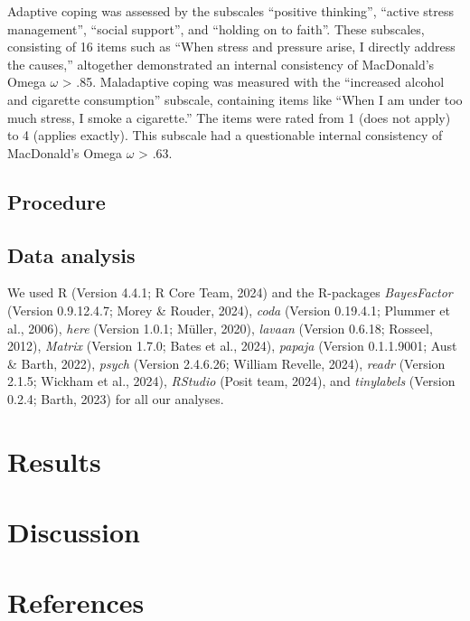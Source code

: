 \documentclass[
  man]{apa6}
\begin{document}
Adaptive coping was assessed by the subscales ``positive thinking'', ``active stress management'', ``social support'', and ``holding on to faith''.
These subscales, consisting of 16 items such as ``When stress and pressure arise, I directly address the causes,'' altogether demonstrated an internal consistency of MacDonald's Omega \(\omega\) \textgreater{} .85.
Maladaptive coping was measured with the ``increased alcohol and cigarette consumption'' subscale, containing items like ``When I am under too much stress, I smoke a cigarette.'' The items were rated from 1 (does not apply) to 4 (applies exactly).
This subscale had a questionable internal consistency of MacDonald's Omega \(\omega\) \textgreater{} .63.

\subsection{Procedure}\label{procedure}

\subsection{Data analysis}\label{data-analysis}

We used R (Version 4.4.1; R Core Team, 2024) and the R-packages \emph{BayesFactor} (Version 0.9.12.4.7; Morey \& Rouder, 2024), \emph{coda} (Version 0.19.4.1; Plummer et al., 2006), \emph{here} (Version 1.0.1; Müller, 2020), \emph{lavaan} (Version 0.6.18; Rosseel, 2012), \emph{Matrix} (Version 1.7.0; Bates et al., 2024), \emph{papaja} (Version 0.1.1.9001; Aust \& Barth, 2022), \emph{psych} (Version 2.4.6.26; William Revelle, 2024), \emph{readr} (Version 2.1.5; Wickham et al., 2024), \emph{RStudio} (Posit team, 2024), and \emph{tinylabels} (Version 0.2.4; Barth, 2023) for all our analyses.

\section{Results}\label{results}

\section{Discussion}\label{discussion}

\newpage

\section{References}\label{references}
\end{document}
